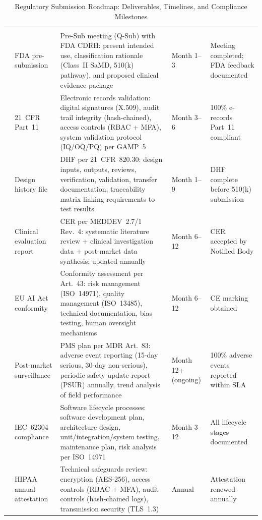 {\tablestripes\tablefontsize
\begin{xltabular}{\textwidth}{@{} p{0.4cm} p{2.2cm} L p{1.5cm} p{1.8cm} @{}}
\caption[Regulatory Submission Roadmap]{Regulatory Submission Roadmap: Deliverables, Timelines, and Compliance Milestones}\label{tab:regulatory_roadmap} \\
\toprule
\thead{\#} &  &  &  &  \\
\midrule
\endfirsthead
\toprule
\thead{\#} &  &  &  &  \\
\midrule
\endhead
\bottomrule
{} & FDA pre-submission & Pre-Sub meeting (Q-Sub) with FDA CDRH: present intended use, classification rationale (Class~II SaMD, 510(k) pathway), and proposed clinical evidence package & Month 1--3 & Meeting completed; FDA feedback documented \\
 & 21~CFR Part~11 & Electronic records validation: digital signatures (X.509), audit trail integrity (hash-chained), access controls (RBAC + MFA), system validation protocol (IQ/OQ/PQ) per GAMP~5 & Month 3--6 & 100\% e-records Part~11 compliant \\
 & Design history file & DHF per 21~CFR~820.30: design inputs, outputs, reviews, verification, validation, transfer documentation; traceability matrix linking requirements to test results & Month 1--9 & DHF complete before 510(k) submission \\
 & Clinical evaluation report & CER per MEDDEV~2.7/1 Rev.~4: systematic literature review + clinical investigation data + post-market data synthesis; updated annually & Month 6--12 & CER accepted by Notified Body \\
 & EU AI Act conformity & Conformity assessment per Art.~43: risk management (ISO~14971), quality management (ISO~13485), technical documentation, bias testing, human oversight mechanisms & Month 6--12 & CE marking obtained \\
 & Post-market surveillance & PMS plan per MDR Art.~83: adverse event reporting (15-day serious, 30-day non-serious), periodic safety update report (PSUR) annually, trend analysis of field performance & Month 12+ (ongoing) & 100\% adverse events reported within SLA \\
 & IEC~62304 compliance & Software lifecycle processes: software development plan, architecture design, unit/integration/system testing, maintenance plan, risk analysis per ISO~14971 & Month 3--12 & All lifecycle stages documented \\
 & HIPAA annual attestation & Technical safeguards review: encryption (AES-256), access controls (RBAC + MFA), audit controls (hash-chained logs), transmission security (TLS~1.3) & Annual & Attestation renewed annually \\
\end{xltabular}}
